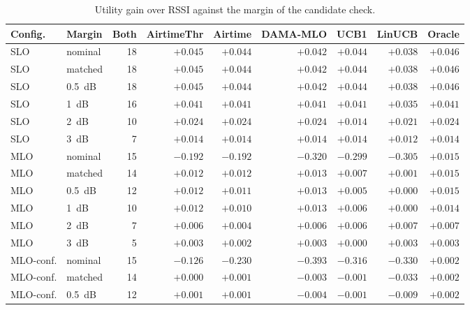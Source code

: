 \begin{table}[t]
\caption{Utility gain over RSSI against the margin of the candidate check.}
\label{tab:margin}
\centering
\small
\begin{tabular}{llrrrrrrr}
\toprule
Config. & Margin & Both & AirtimeThr & Airtime & DAMA-MLO & UCB1 & LinUCB & Oracle \\
\midrule
SLO & nominal & 18 & $\mathbf{+0.045}$ & $\mathbf{+0.044}$ & $\mathbf{+0.042}$ & $\mathbf{+0.044}$ & $\mathbf{+0.038}$ & $\mathbf{+0.046}$ \\
SLO & matched & 18 & $\mathbf{+0.045}$ & $\mathbf{+0.044}$ & $\mathbf{+0.042}$ & $\mathbf{+0.044}$ & $\mathbf{+0.038}$ & $\mathbf{+0.046}$ \\
SLO & 0.5~dB & 18 & $\mathbf{+0.045}$ & $\mathbf{+0.044}$ & $\mathbf{+0.042}$ & $\mathbf{+0.044}$ & $\mathbf{+0.038}$ & $\mathbf{+0.046}$ \\
SLO & 1~dB & 16 & $\mathbf{+0.041}$ & $\mathbf{+0.041}$ & $\mathbf{+0.041}$ & $\mathbf{+0.041}$ & $\mathbf{+0.035}$ & $\mathbf{+0.041}$ \\
SLO & 2~dB & 10 & $+0.024$ & $+0.024$ & $+0.024$ & $+0.014$ & $+0.021$ & $+0.024$ \\
SLO & 3~dB & 7 & $+0.014$ & $+0.014$ & $+0.014$ & $+0.014$ & $+0.012$ & $+0.014$ \\
\midrule
MLO & nominal & 15 & $-0.192$ & $-0.192$ & $-0.320$ & $-0.299$ & $-0.305$ & $\mathbf{+0.015}$ \\
MLO & matched & 14 & $\mathbf{+0.012}$ & $\mathbf{+0.012}$ & $\mathbf{+0.013}$ & $+0.007$ & $+0.001$ & $\mathbf{+0.015}$ \\
MLO & 0.5~dB & 12 & $\mathbf{+0.012}$ & $\mathbf{+0.011}$ & $\mathbf{+0.013}$ & $+0.005$ & $+0.000$ & $\mathbf{+0.015}$ \\
MLO & 1~dB & 10 & $+0.012$ & $+0.010$ & $+0.013$ & $+0.006$ & $+0.000$ & $\mathbf{+0.014}$ \\
MLO & 2~dB & 7 & $+0.006$ & $+0.004$ & $+0.006$ & $+0.006$ & $+0.007$ & $+0.007$ \\
MLO & 3~dB & 5 & $+0.003$ & $+0.002$ & $+0.003$ & $+0.000$ & $+0.003$ & $+0.003$ \\
\midrule
MLO-conf. & nominal & 15 & $-0.126$ & $-0.230$ & $\mathbf{-0.393}$ & $-0.316$ & $\mathbf{-0.330}$ & $+0.002$ \\
MLO-conf. & matched & 14 & $+0.000$ & $+0.001$ & $-0.003$ & $-0.001$ & $\mathbf{-0.033}$ & $+0.002$ \\
MLO-conf. & 0.5~dB & 12 & $+0.001$ & $+0.001$ & $-0.004$ & $-0.001$ & $\mathbf{-0.009}$ & $+0.002$ \\

\end{tabular}
\end{table}
